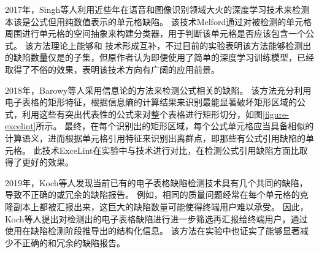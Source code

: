 

2017年，Singh等人\cite{singh2017melford}利用近些年在语音和图像识别领域大火的深度学习技术来检测本该是公式但用纯数值表示的单元格缺陷。
该技术Melford通过对被检测的单元格周围进行单元格的空间抽象来构建分类器，用于判断该单元格是否应该包含一个公式。
该方法理论上能够和 \cu 技术形成互补，不过目前的实验表明该方法能够检测出的缺陷数量仅是\cu 的子集，但原作者认为即便使用了简单的深度学习训练模型，已经取得了不俗的效果，表明该技术方向有广阔的应用前景。

2018年，Barowy等人\cite{Barowy2018excelint}采用信息论的方法来检测公式相关的缺陷。
该方法充分利用电子表格的矩形特征，根据信息熵的计算结果来识别最能显著破坏矩形区域的公式，利用这些有突出代表性的公式来对整个表格进行矩形切分，如图\ref{figure-excelint}所示。
最终，在每个识别出的矩形区域，每个公式单元格应当具备相似的计算语义，进而根据单元格引用特征来识别出离群点，即那些有公式引用缺陷的单元格。
此技术ExceLint在实验中\cite{Barowy2018excelint}与\cu 技术进行对比，在检测公式引用缺陷方面比\cu 取得了更好的效果。

2019年，Koch等人\cite{koch2019refinement}发现当前已有的电子表格缺陷检测技术具有几个共同的缺陷，导致不正确的或冗余的缺陷报告。
例如，相同的质量问题经常在每个单元格的克隆副本上都被汇报出来，这巨大的缺陷数量可能使得终端用户难以承受。
因此，Koch等人提出对检测出的电子表格缺陷进行进一步筛选再汇报给终端用户，通过使用在缺陷检测阶段推导出的结构化信息。
该方法在实验中也证实了能够显著减少不正确的和冗余的缺陷报告。





